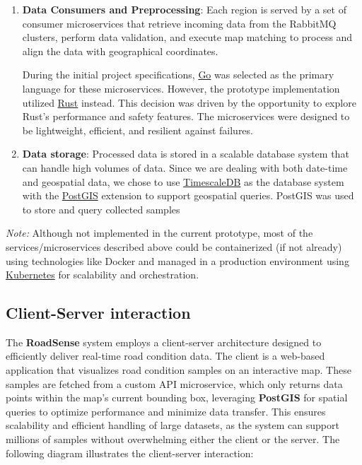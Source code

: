 \begin{enumerate}
	\item \textbf{Data Consumers and Preprocessing}: Each region is served by a set of consumer microservices that retrieve incoming data from the RabbitMQ clusters, perform data validation, and execute map matching to process and align the data with geographical coordinates.

	      During the initial project specifications, \href{https://golang.org/}{Go} was selected as the primary language for these microservices. However, the prototype implementation utilized \href{https://rust-lang.org/}{Rust} instead. This decision was driven by the opportunity to explore Rust's performance and safety features. The microservices were designed to be lightweight, efficient, and resilient against failures.

	\item \textbf{Data storage}: Processed data is stored in a scalable database system that can handle high volumes of data. Since we are dealing with both date-time and geospatial data, we chose to use \href{https://www.timescale.com/}{TimescaleDB} as the database system with the \href{https://postgis.net/}{PostGIS} extension to support geospatial queries.
	      PostGIS was used to store and query collected samples
\end{enumerate}

\noindent \textit{Note:} Although not implemented in the current prototype, most of the services/microservices described above could be containerized (if not already) using technologies like Docker and managed in a production environment using \href{https://kubernetes.io/}{Kubernetes} for scalability and orchestration.

\subsection{Client-Server interaction}

The \textbf{RoadSense} system employs a client-server architecture designed to efficiently deliver real-time road condition data. The client is a web-based application that visualizes road condition samples on an interactive map. These samples are fetched from a custom API microservice, which only returns data points within the map's current bounding box, leveraging \textbf{PostGIS} for spatial queries to optimize performance and minimize data transfer. This ensures scalability and efficient handling of large datasets, as the system can support millions of samples without overwhelming either the client or the server. The following diagram illustrates the client-server interaction:


